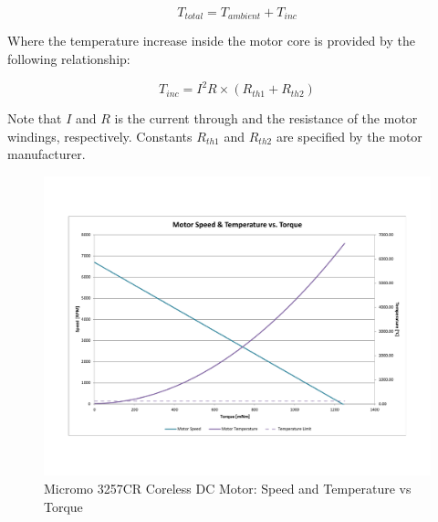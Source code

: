 \begin{equation}
	T_{total} = T_{ambient} + T_{inc}
\end{equation}

Where the temperature increase inside the motor core is provided by the following relationship: 

\begin{equation}
	T_{inc} = I^{2}R \times (R_{th1} + R_{th2})
\end{equation}

Note that $I$ and $R$ is the current through and the resistance of the motor windings, respectively. Constants $R_{th1}$ and $R_{th2}$ are specified by the motor manufacturer. 


\begin{figure}[!ht]
	\begin{center}
    \includegraphics[scale=0.6]{fig/design/motor3.pdf}
	\end{center}
  \caption{Micromo 3257CR Coreless DC Motor: Speed and Temperature vs Torque}
\end{figure}


